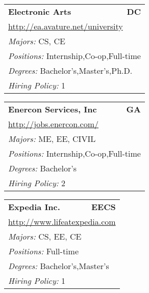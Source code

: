 \documentclass[twoside]{article}
\begin{document}
\begin{center}
\begin{multicols}{3}
\begin{FlushLeft}
\begin{minipage}{.9\columnwidth}
\end{minipage}
 
\begin{minipage}{.9\columnwidth}\begin{tabularx}{.95\columnwidth}{Xr}
                 {\Large\bf Electronic Arts} & {\Large\bf DC}\\
    \multicolumn{2}{p{.95\columnwidth}}{\url{http://ea.avature.net/university}}\\
    \multicolumn{2}{p{.95\columnwidth}}{\emph{Majors:} CS, CE}\\
    \multicolumn{2}{p{.95\columnwidth}}{\emph{Positions:} Internship,Co-op,Full-time}\\
    \multicolumn{2}{p{.95\columnwidth}}{\emph{Degrees:} Bachelor's,Master's,Ph.D.}\\
    \multicolumn{2}{p{.95\columnwidth}}{\emph{Hiring Policy:} 1}\\
    \end{tabularx}
    
\end{minipage}
 
\begin{minipage}{.9\columnwidth}\begin{tabularx}{.95\columnwidth}{Xr}
                 {\Large\bf Enercon Services, Inc} & {\Large\bf GA}\\
    \multicolumn{2}{p{.95\columnwidth}}{\url{http://jobs.enercon.com/}}\\
    \multicolumn{2}{p{.95\columnwidth}}{\emph{Majors:} ME, EE, CIVIL}\\
    \multicolumn{2}{p{.95\columnwidth}}{\emph{Positions:} Internship,Co-op,Full-time}\\
    \multicolumn{2}{p{.95\columnwidth}}{\emph{Degrees:} Bachelor's}\\
    \multicolumn{2}{p{.95\columnwidth}}{\emph{Hiring Policy:} 2}\\
    \end{tabularx}
    
\end{minipage}
 
\begin{minipage}{.9\columnwidth}\begin{tabularx}{.95\columnwidth}{Xr}
                 {\Large\bf Expedia Inc.} & {\Large\bf EECS}\\
    \multicolumn{2}{p{.95\columnwidth}}{\url{http://www.lifeatexpedia.com}}\\
    \multicolumn{2}{p{.95\columnwidth}}{\emph{Majors:} CS, EE, CE}\\
    \multicolumn{2}{p{.95\columnwidth}}{\emph{Positions:} Full-time}\\
    \multicolumn{2}{p{.95\columnwidth}}{\emph{Degrees:} Bachelor's,Master's}\\
    \multicolumn{2}{p{.95\columnwidth}}{\emph{Hiring Policy:} 1}\\
    \end{tabularx}
    

\end{minipage}
\end{FlushLeft}
\end{multicols}
\end{center}
\end{document}
